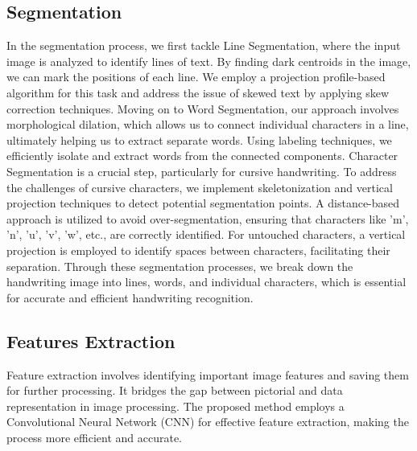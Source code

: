 \subsection{Segmentation}
In the segmentation process, we first tackle Line Segmentation, where the input image is       analyzed to identify lines of text. By finding dark centroids in the image, we can mark the positions of each line. We employ a projection profile-based algorithm for this task and address the issue of skewed text by applying skew correction techniques.\newline 
Moving on to Word Segmentation, our approach involves morphological dilation, which allows us to connect individual characters in a line, ultimately helping us to extract separate words. Using labeling techniques, we efficiently isolate and extract words from the connected components.\newline 
Character Segmentation is a crucial step, particularly for cursive handwriting. To address the challenges of cursive characters, we implement skeletonization and vertical projection techniques to detect potential segmentation points. A distance-based approach is utilized to avoid over-segmentation, ensuring that characters like 'm', 'n', 'u', 'v', 'w', etc., are correctly identified. For untouched characters, a vertical projection is employed to identify spaces between characters, facilitating their separation.\newline
Through these segmentation processes, we break down the handwriting image into lines, words, and individual characters, which is essential for accurate and efficient handwriting recognition.
\subsection{Features Extraction}
Feature extraction involves identifying important image features and saving them for further processing. It bridges the gap between pictorial and data representation in image processing. The proposed method employs a Convolutional Neural Network (CNN) for effective feature extraction, making the process more efficient and accurate.
